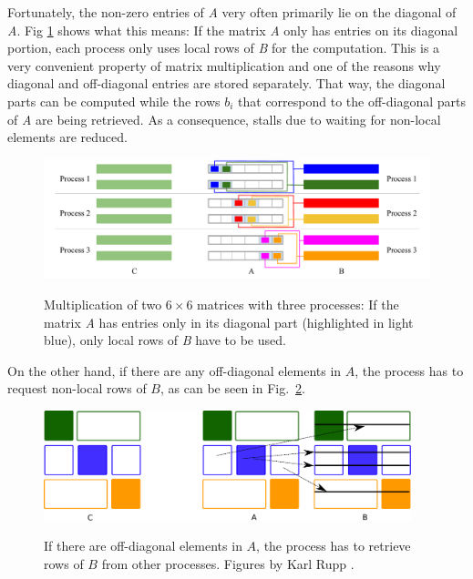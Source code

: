 Fortunately, the non-zero entries of \textit{A} very often primarily lie on the diagonal of \textit{A}. Fig \ref{fig:matmult_diagonal} shows what this means: If the matrix \textit{A} only has entries on its diagonal portion, each process only uses local rows of \textit{B} for the computation. This is a very convenient property of matrix multiplication and one of the reasons why diagonal and off-diagonal entries are stored separately. That way, the diagonal parts can be computed while the rows $b_i$ that correspond to the off-diagonal parts of \textit{A} are being retrieved. As a consequence, stalls due to waiting for non-local elements are reduced. 

\begin{figure}[tb]
\centering
{\includegraphics[width=1.05\textwidth]{matrix_multiplication_diagonal}}
\caption{Multiplication of two $6\times 6$ matrices with three processes: If the matrix \textit{A} has entries only in its diagonal part (highlighted in light blue), only local rows of \textit{B} have to be used.}
\label{fig:matmult_diagonal}
\end{figure}

On the other hand, if there are any off-diagonal elements in $A$, the process has to request non-local rows of $B$, as can be seen in Fig.~\ref{fig:parallel-2}. 


\begin{figure}[tb]
\centering
\vspace{5mm}
{\includegraphics[width=0.95\textwidth]{parallel/spgemm-parallel-2}}
\caption{If there are off-diagonal elements in $A$, the process has to retrieve rows of $B$ from other processes. Figures by Karl Rupp \cite{karli_LANS_image}.}
\label{fig:parallel-2}
\end{figure}



